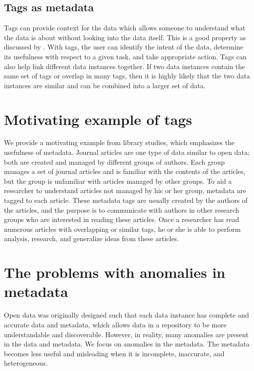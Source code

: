 \subsection{Tags as metadata}

Tags can provide context for the data which allows someone to understand what the data is about without looking into the data itself. This is a good property as discussed by \cite{Wilkinson2016FAIR}. With tags, the user can identify the intent of the data, determine its usefulness with respect to a given task, and take appropriate action. Tags can also help link different data instances together. If two data instances contain the same set of tags or overlap in many tags, then it is highly likely that the two data instances are similar and can be combined into a larger set of data.

\section{Motivating example of tags}
\label{sec:MotivatingExampleOfTags}

We provide a motivating example from library studies, which emphasizes the usefulness of metadata. Journal articles are one type of data similar to open data; both are created and managed by different groups of authors. Each group manages a set of journal articles and is familiar with the contents of the articles, but the group is unfamiliar with articles managed by other groups. To aid a researcher to understand articles not managed by his or her group, metadata are tagged to each article. These metadata tags are usually created by the authors of the articles, and the purpose is to communicate with authors in other research groups who are interested in reading these articles. Once a researcher has read numerous articles with overlapping or similar tags, he or she is able to perform analysis, research, and generalize ideas from these articles.

\section{The problems with anomalies in metadata}
\label{sec:TheProblemsWithAnomaliesInMetadata}

Open data was originally designed such that each data instance has complete and accurate data and metadata, which allows data in a repository to be more understandable and discoverable. However, in reality, many anomalies are present in the data and metadata. We focus on anomalies in the metadata. The metadata becomes less useful and misleading when it is incomplete, inaccurate, and heterogeneous.

